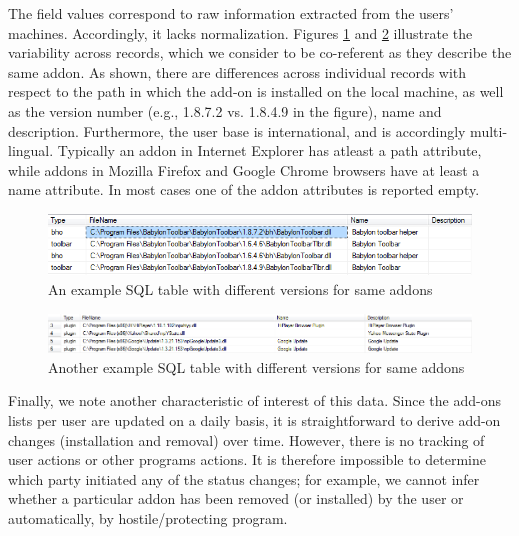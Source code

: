 \documentclass[11pt,oneside]{book}
\begin{document}
The field values correspond to raw information extracted from the users' machines. Accordingly, it lacks normalization. Figures \ref{fig:addons_versioning_snapshot} and \ref{fig:addons_versioning_snapshot_desc} illustrate the variability across records, which we consider to be co-referent as they describe the same addon. As shown, there are differences across individual records with respect to the path in which the add-on is installed on the local machine, as well as the version number (e.g., 1.8.7.2 vs. 1.8.4.9 in the figure), name and description. Furthermore, the user base is international, and is accordingly multi-lingual.   Typically an addon in Internet Explorer has atleast a path attribute, while addons in Mozilla Firefox and Google Chrome browsers have at least a name attribute. In most cases one of the addon attributes is reported empty.

\begin{figure}[t]
\centering
\begin{small}
\includegraphics[scale=.8,angle=0]{figures/addons_versioning_snapshot.png}
\end{small}
\caption{An example SQL table with different versions for same addons}
\label{fig:addons_versioning_snapshot}
\end{figure}

\begin{figure}[t]
\centering
\begin{small}
\includegraphics[scale=.8,angle=0]{figures/addons_versioning_snapshot_desc.png}
\end{small}
\caption{Another example SQL table with different versions for same addons}
\label{fig:addons_versioning_snapshot_desc}
\end{figure}

Finally, we note another characteristic of interest of this data.  Since the add-ons lists per user are updated on a daily basis, it is straightforward to derive add-on changes (installation and removal) over time. However, there is no tracking of user actions or other programs actions. It is therefore impossible to determine which party initiated any of the status changes; for example, we cannot infer whether a particular addon has been removed (or installed) by the user or automatically, by hostile/protecting program. 
\end{document}
